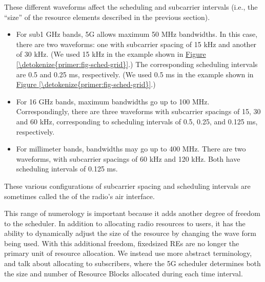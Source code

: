 \documentclass[a4paper,11pt,english]{sphinxmanual}
\begin{document}
\sphinxAtStartPar
These different waveforms affect the scheduling and subcarrier intervals
(i.e., the “size” of the resource elements described in the previous
section).
\begin{itemize}
\item {} 
\sphinxAtStartPar
For sub\sphinxhyphen{}1 GHz bands, 5G allows maximum 50 MHz bandwidths. In this case,
there are two waveforms: one with subcarrier spacing of 15 kHz and
another of 30 kHz. (We used 15 kHz in the example shown in
\hyperref[\detokenize{primer:fig-sched-grid}]{Figure \ref{\detokenize{primer:fig-sched-grid}}}.)
The corresponding scheduling intervals are
0.5 and 0.25 ms, respectively. (We used 0.5 ms in the example shown
in \hyperref[\detokenize{primer:fig-sched-grid}]{Figure \ref{\detokenize{primer:fig-sched-grid}}}.)

\item {} 
\sphinxAtStartPar
For 1\sphinxhyphen{}6 GHz bands, maximum bandwidths go up to 100 MHz.
Correspondingly, there are three waveforms with subcarrier spacings
of 15, 30 and 60 kHz, corresponding to scheduling intervals of
0.5, 0.25, and 0.125 ms, respectively.

\item {} 
\sphinxAtStartPar
For millimeter bands, bandwidths may go up to 400 MHz. There are two
waveforms, with subcarrier spacings of 60 kHz and 120 kHz. Both have
scheduling intervals of 0.125 ms.

\end{itemize}

\sphinxAtStartPar
These various configurations of subcarrier spacing and scheduling
intervals are sometimes called the  of the radio’s air
interface.

\sphinxAtStartPar
This range of numerology is important because it adds another degree
of freedom to the scheduler. In addition to allocating radio resources
to users, it has the ability to dynamically adjust the size of the
resource by changing the wave form being used. With this additional
freedom, fixed\sphinxhyphen{}sized REs are no longer the primary unit of resource
allocation.  We instead use more abstract terminology, and talk about
allocating  to subscribers, where the 5G scheduler
determines both the size and number of Resource Blocks allocated
during each time interval.
\end{document}
